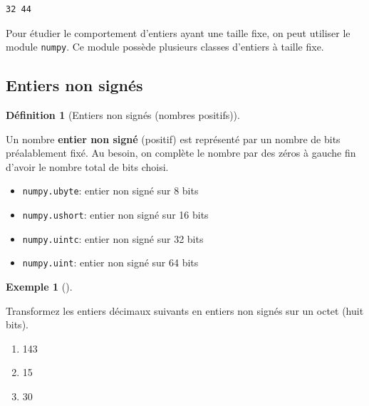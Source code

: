 \documentclass[
  letterpaper,
]{scrbook}
\providecommand{\tightlist}{%
  \setlength{\itemsep}{0pt}\setlength{\parskip}{0pt}}\usepackage{longtable,booktabs,array}
\theoremstyle{plain}
\theoremstyle{definition}
\newtheorem{definition}{Définition}[chapter]
\theoremstyle{definition}
\newtheorem{example}{Exemple}[chapter]
\theoremstyle{remark}
\begin{document}
\begin{verbatim}
32 44
\end{verbatim}

Pour étudier le comportement d'entiers ayant une taille fixe, on peut
utiliser le module \texttt{numpy}. Ce module possède plusieurs classes
d'entiers à taille fixe.

\hypertarget{entiers-non-signuxe9s}{%
\subsection{Entiers non signés}\label{entiers-non-signuxe9s}}

\begin{definition}[Entiers non signés (nombres
positifs)]\protect\hypertarget{def-entiers-non-signes}{}\label{def-entiers-non-signes}

Un nombre \textbf{entier non signé} (positif) est représenté par un
nombre de bits préalablement fixé. Au besoin, on complète le nombre par
des zéros à gauche fin d'avoir le nombre total de bits choisi.

\end{definition}

\begin{tcolorbox}[enhanced jigsaw, colbacktitle=quarto-callout-tip-color!10!white, toptitle=1mm, left=2mm, toprule=.15mm, opacityback=0, bottomrule=.15mm, breakable, coltitle=black, title=\textcolor{quarto-callout-tip-color}{\faLightbulb}\hspace{0.5em}{Les entiers non signés à taille fixe en \texttt{Python}}, colframe=quarto-callout-tip-color-frame, arc=.35mm, titlerule=0mm, rightrule=.15mm, opacitybacktitle=0.6, leftrule=.75mm, bottomtitle=1mm, colback=white]

\begin{itemize}
\tightlist
\item
  \texttt{numpy.ubyte}: entier non signé sur 8 bits
\item
  \texttt{numpy.ushort}: entier non signé sur 16 bits
\item
  \texttt{numpy.uintc}: entier non signé sur 32 bits
\item
  \texttt{numpy.uint}: entier non signé sur 64 bits
\end{itemize}

\end{tcolorbox}

\begin{example}[]\protect\hypertarget{exm-entiers-non-signes}{}\label{exm-entiers-non-signes}

Transformez les entiers décimaux suivants en entiers non signés sur un
octet (huit bits).

\begin{enumerate}
\def\labelenumi{\alph{enumi})}
\tightlist
\item
  143
\item
  15
\item
  30
\end{enumerate}

\end{example}
\end{document}
